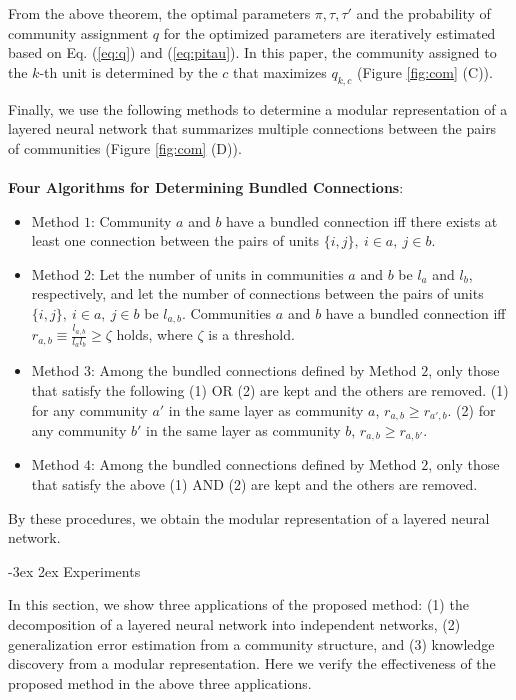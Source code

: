 \documentclass[12pt]{article} %
\makeatletter
\renewcommand\section{\@startsection {section}{1}%
{\z@}%
{-3ex}%
{2ex}%
{\normalfont\normalsize\bfseries}}
\makeatother
\begin{document}
From the above theorem, the optimal parameters $\pi, \tau, \tau'$ and the probability of community assignment $q$ for the optimized parameters are iteratively estimated based on Eq. (\ref{eq:q}) and (\ref{eq:pitau}). In this paper, the community assigned to the $k$-th unit is determined by the $c$ that maximizes $q_{k,c}$ (Figure \ref{fig:com} (C)).

Finally, we use the following methods to determine a modular representation of a layered neural network that summarizes multiple connections between the pairs of communities (Figure \ref{fig:com} (D)). \\
\\
\textbf{Four Algorithms for Determining Bundled Connections}:
\begin{itemize}
\item Method $1$: Community $a$ and $b$ have a bundled connection iff there exists at least one connection between the pairs of units $\{i,j\},\ i\in a,\ j\in b$.
\item Method $2$: Let the number of units in communities $a$ and $b$ be $l_a$ and $l_b$, respectively, and let the number of connections between the pairs of units $\{i,j\},\ i\in a,\ j\in b$ be $l_{a,b}$. 
Communities $a$ and $b$ have a bundled connection iff $r_{a,b}\equiv \frac{l_{a,b}}{l_a l_b}\geq \zeta$ holds, where $\zeta$ is a threshold.
\item Method $3$: Among the bundled connections defined by Method $2$, only those that satisfy the following (1) OR (2) are kept and the others are removed. (1) for any community $a'$ in the same layer as community $a$, $r_{a,b}\geq r_{a',b}$. (2) for any community $b'$ in the same layer as community $b$, $r_{a,b}\geq r_{a,b'}$.
\item Method $4$: Among the bundled connections defined by Method $2$, only those that satisfy the above (1) AND (2) are kept and the others are removed. 
\end{itemize}

By these procedures, we obtain the modular representation of a layered neural network. 

\section{Experiments} %
\label{sec:experiment}

In this section, we show three applications of the proposed method: (1) the decomposition of a layered neural network into independent networks, (2) generalization error estimation from a community structure, and (3) knowledge discovery from a modular representation. Here we verify the effectiveness of the proposed method in the above three applications. 
\end{document}
